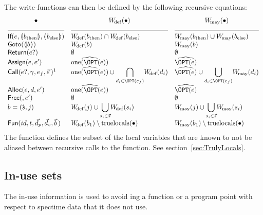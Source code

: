 \begin{docpart}
The write-functions can then be defined by the following recursive equations:
\[
\begin{array}{lll}
  \hfil \bullet & \hfil \Wdef(\bullet) & \hfil \Wmay(\bullet) \\
  \hrulefill & \hrulefill & \hrulefill \\
  \cons{If}(e,\coreXref{b_{\mathrm{then}}},
  \coreXref{b_{\mathrm{else}}}) & \Wdef(b_{\mathrm{then}}) \cap
  \Wdef(b_{\mathrm{else}}) & \Wmay(b_{\mathrm{then}}) \cup
  \Wmay(b_{\mathrm{else}}) \\
  \cons{Goto}(\coreXref b) & \Wdef(b) &
  \Wmay(b) \\
  \cons{Return}(e?) & \emptyset & \emptyset \\
  \cons{Assign}(e,e') & \subdecl{\exactlyone(\OPT(e))} &
  \subdecl{\OPT(e)} \\
  \cons{Call}(e?,\gamma,e_f,\vec e\,)\footnotemark
  & \subdecl{\exactlyone(\OPT(e))}
  \cup {\displaystyle \bigcap_{d_i \in \OPT(e_f)}} \Wdef(d_i) &
  \subdecl{\OPT(e)} \cup {\displaystyle \bigcup_{d_i \in \OPT(e_f)}} \Wmay(d_i) \\
  \cons{Alloc}(e,d,e') & \subdecl{\exactlyone(\OPT(e))} & \subdecl{\OPT(e)} \\
  \cons{Free}(,e') & \emptyset & \emptyset \\
  b = (\vec s,j) & \Wdef(j) \cup {\displaystyle \bigcup_{s_i \in \vec s}}
  \Wdef(s_i) & \Wmay(j) \cup {\displaystyle \bigcup_{s_i \in \vec s}}
  \Wmay(s_i) \\
  \cons{Fun}(id,t,\vec d_p,\vec d_v,\vec b\,) & \Wdef(b_1) \setminus
  \trulylocal(\bullet) &
  \Wmay(b_1) \setminus  \trulylocal(\bullet) \\
\end{array}
\]
The \trulylocal function defines the subset of the local variables
that are known to not be aliased between recursive calls to the function.
See section~\ref{sec:TrulyLocals}. 

\subsection{In-use sets}
The in-use information is used to avoid {\specialis}ing a function
or a program point with respect to spectime data that it does not use.


\end{docpart}
